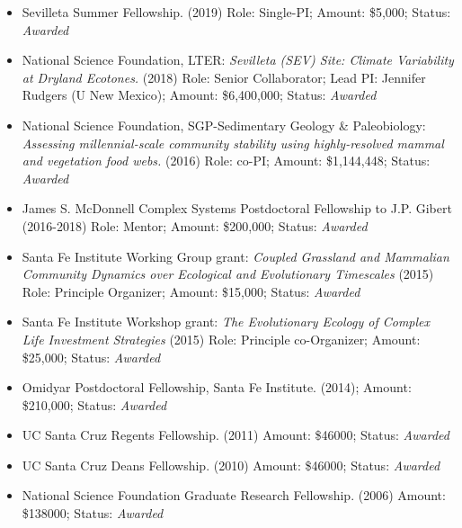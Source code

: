 \documentclass[margin,line,12pt]{res}
\begin{document}
\begin{resume}
\begin{itemize}
\item Sevilleta Summer Fellowship. (2019) Role: Single-PI; Amount: \$5,000; Status: \emph{Awarded}

\item National Science Foundation, LTER: \emph{Sevilleta (SEV) Site: Climate Variability at Dryland Ecotones.} (2018) Role: Senior Collaborator; Lead PI: Jennifer Rudgers (U New Mexico); Amount: \$6,400,000; Status: \emph{Awarded}

\item National Science Foundation, SGP-Sedimentary Geology \& Paleobiology: \emph{Assessing millennial-scale community stability using highly-resolved mammal and vegetation food webs.} (2016) Role: co-PI; Amount: \$1,144,448; Status: \emph{Awarded}

\item James S. McDonnell Complex Systems Postdoctoral Fellowship to J.P. Gibert (2016-2018) Role: Mentor; Amount: \$200,000; Status: \emph{Awarded}

\item Santa Fe Institute Working Group grant: \emph{Coupled Grassland and Mammalian Community Dynamics over Ecological and Evolutionary Timescales} (2015) Role: Principle Organizer; Amount: \$15,000; Status: \emph{Awarded}

\item Santa Fe Institute Workshop grant: \emph{The Evolutionary Ecology of Complex Life Investment Strategies} (2015) Role: Principle co-Organizer; Amount: \$25,000; Status: \emph{Awarded}

\item Omidyar Postdoctoral Fellowship, Santa Fe Institute. (2014); Amount: \$210,000; Status: \emph{Awarded}

\item UC Santa Cruz Regents Fellowship. (2011) Amount: \$46000; Status: \emph{Awarded}

\item UC Santa Cruz Deans Fellowship. (2010) Amount: \$46000; Status: \emph{Awarded}

\item National Science Foundation Graduate Research Fellowship. (2006) Amount: \$138000; Status: \emph{Awarded}


\end{itemize}
\end{resume}
\end{document}
